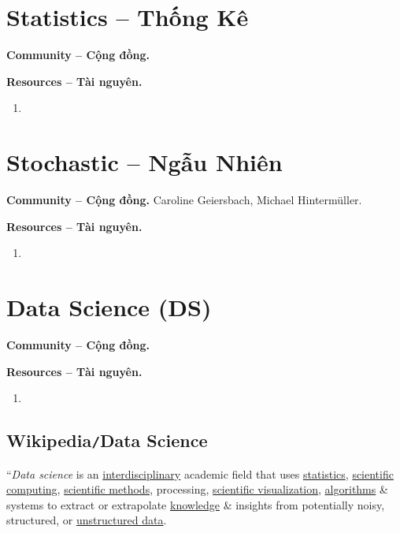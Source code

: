 \documentclass{article}
\begin{document}
\section{Statistics -- Thống Kê}
\textbf{\textsf{Community -- Cộng đồng.}} 

\noindent\textbf{\textsf{Resources -- Tài nguyên.}}
\begin{enumerate}
	\item 
\end{enumerate}


\section{Stochastic -- Ngẫu Nhiên}
\textbf{\textsf{Community -- Cộng đồng.}} {\sc Caroline Geiersbach}, {\sc Michael Hinterm\"uller}.

\noindent\textbf{\textsf{Resources -- Tài nguyên.}}
\begin{enumerate}
	\item 
\end{enumerate}


\section{Data Science (DS)}
\textbf{\textsf{Community -- Cộng đồng.}} 

\noindent\textbf{\textsf{Resources -- Tài nguyên.}}
\begin{enumerate}
	\item 
\end{enumerate}

\subsection{Wikipedia{\tt/}Data Science}
``{\it Data science} is an \href{https://en.wikipedia.org/wiki/Interdisciplinary}{interdisciplinary} academic field that uses \href{https://en.wikipedia.org/wiki/Statistics}{statistics}, \href{https://en.wikipedia.org/wiki/Scientific_computing}{scientific computing}, \href{https://en.wikipedia.org/wiki/Scientific_method}{scientific methods}, processing, \href{https://en.wikipedia.org/wiki/Scientific_visualization}{scientific visualization}, \href{https://en.wikipedia.org/wiki/Algorithm}{algorithms} \& systems to extract or extrapolate \href{https://en.wikipedia.org/wiki/Knowledge}{knowledge} \& insights from potentially noisy, structured, or \href{https://en.wikipedia.org/wiki/Unstructured_data}{unstructured data}.
\end{document}
